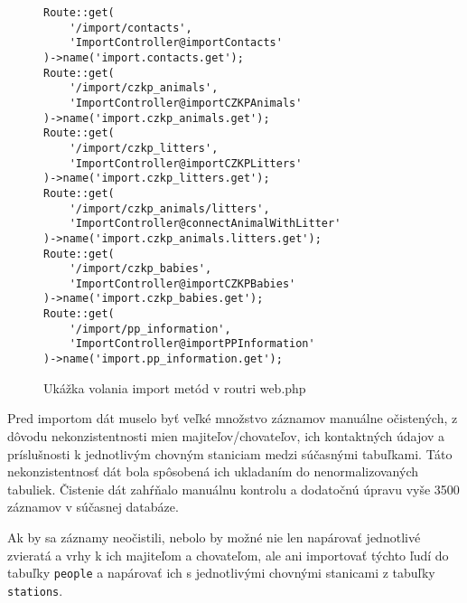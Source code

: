 \begin{figure}[H]
\begin{verbatim}
Route::get(
    '/import/contacts',
    'ImportController@importContacts'
)->name('import.contacts.get');
Route::get(
    '/import/czkp_animals',
    'ImportController@importCZKPAnimals'
)->name('import.czkp_animals.get');
Route::get(
    '/import/czkp_litters',
    'ImportController@importCZKPLitters'
)->name('import.czkp_litters.get');
Route::get(
    '/import/czkp_animals/litters',
    'ImportController@connectAnimalWithLitter'
)->name('import.czkp_animals.litters.get');
Route::get(
    '/import/czkp_babies',
    'ImportController@importCZKPBabies'
)->name('import.czkp_babies.get');
Route::get(
    '/import/pp_information',
    'ImportController@importPPInformation'
)->name('import.pp_information.get');
\end{verbatim}
\caption[Ukážka volania import metód v routri web.php]
{Ukážka volania import metód v routri web.php}
\label{router-import-code}
\end{figure}

Pred importom dát muselo byť veľké množstvo záznamov manuálne očistených, z dôvodu nekonzistentnosti mien majiteľov/chovateľov, ich kontaktných údajov a príslušnosti k jednotlivým chovným staniciam medzi súčasnými tabuľkami. Táto nekonzistentnosť dát bola spôsobená ich ukladaním do nenormalizovaných tabuliek. Čistenie dát zahŕňalo manuálnu kontrolu a dodatočnú úpravu vyše 3500 záznamov v súčasnej databáze.

Ak by sa záznamy neočistili, nebolo by možné nie len napárovať jednotlivé zvieratá a vrhy k ich majiteľom a chovateľom, ale ani importovať týchto ľudí do tabuľky \texttt{people} a napárovať ich s jednotlivými chovnými stanicami z tabuľky \texttt{stations}.
